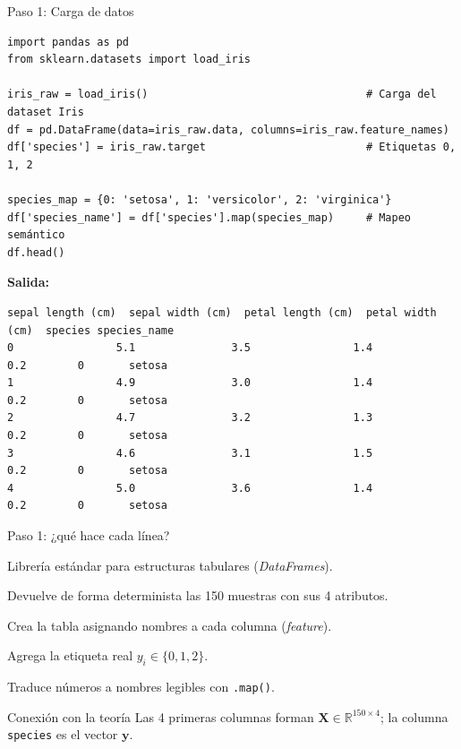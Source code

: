 \documentclass[10pt,aspectratio=169]{beamer}
\begin{document}
\begin{frame}[fragile]{Paso 1: Carga de datos}
  \begin{lstlisting}
import pandas as pd
from sklearn.datasets import load_iris

iris_raw = load_iris()                                  # Carga del dataset Iris
df = pd.DataFrame(data=iris_raw.data, columns=iris_raw.feature_names)
df['species'] = iris_raw.target                         # Etiquetas 0, 1, 2

species_map = {0: 'setosa', 1: 'versicolor', 2: 'virginica'}
df['species_name'] = df['species'].map(species_map)     # Mapeo semántico
df.head()
  \end{lstlisting}
  \textbf{Salida:}
  \begin{lstlisting}[style=salida]
   sepal length (cm)  sepal width (cm)  petal length (cm)  petal width (cm)  species species_name
0                5.1               3.5                1.4               0.2        0       setosa
1                4.9               3.0                1.4               0.2        0       setosa
2                4.7               3.2                1.3               0.2        0       setosa
3                4.6               3.1                1.5               0.2        0       setosa
4                5.0               3.6                1.4               0.2        0       setosa
  \end{lstlisting}
\end{frame}

\begin{frame}{Paso 1: ¿qué hace cada línea?}
  \small
  \begin{description}
    \item[\texttt{import pandas as pd}] Librería estándar para estructuras tabulares (\emph{DataFrames}).
    \item[\texttt{load\_iris()}] Devuelve de forma determinista las 150 muestras con sus 4 atributos.
    \item[\texttt{pd.DataFrame(...)}] Crea la tabla asignando nombres a cada columna (\emph{feature}).
    \item[\texttt{df['species']}] Agrega la etiqueta real $y_i \in \{0,1,2\}$.
    \item[\texttt{df['species\_name']}] Traduce números a nombres legibles con \texttt{.map()}.
  \end{description}
  \vfill
  \begin{block}{Conexión con la teoría}
    Las 4 primeras columnas forman $\mathbf{X}\in\mathbb{R}^{150\times4}$; la columna \texttt{species} es el vector $\mathbf{y}$.
  \end{block}
\end{frame}
\end{document}
